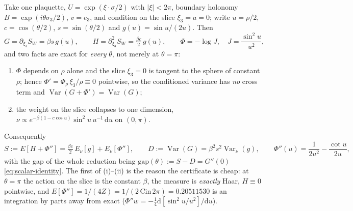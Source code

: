 Take one plaquette, $U=\exp(\xi\cdot\sigma/2)$ with $|\xi|<2\pi$, boundary holonomy
$B=\exp(i\theta\sigma_{3}/2)$, $v=e_{3}$, and condition on the slice $\xi_{3}=a=0$; write
$u=\rho/2$, $c=\cos(\theta/2)$, $s=\sin(\theta/2)$ and
$g(u)=\sin u/(2u)$. Then
\begin{equation}
G=\partial_{\xi_{3}}S_W=\beta s\,g(u),\qquad
H=\partial^{2}_{\xi_{3}}S_W=\tfrac{\beta c}{2}\,g(u),\qquad
\Phi=-\log J,\quad J=\frac{\sin^{2}u}{u^{2}} ,
\label{eq:h1s-GH}
\end{equation}
and two facts are exact for \emph{every} $\theta$, not merely at $\theta=\pi$:
\begin{enumerate}[label=(\roman*)]
\item $\Phi$ depends on $\rho$ alone and the slice $\xi_{3}=0$ is tangent to the sphere of constant
  $\rho$; hence $\Phi'=\Phi_{\rho}\,\xi_{3}/\rho\equiv0$ pointwise, so the conditioned variance has
  \emph{no} cross term and $\operatorname{Var}(G+\Phi')=\operatorname{Var}(G)$;
\item the weight on the slice collapses to one dimension,
  $\nu\propto e^{-\beta(1-c\cos u)}\sin^{2}u\,u^{-1}\,\mathrm{d} u$ on $(0,\pi)$.
\end{enumerate}
Consequently
\begin{equation}
S:=E[H+\Phi'']=\tfrac{\beta c}{2}\,E_{\nu}[g]+E_{\nu}[\Phi''],\qquad
D:=\operatorname{Var}(G)=\beta^{2}s^{2}\operatorname{Var}_{\nu}(g),
\qquad
\Phi''(u)=\frac{1}{2u^{2}}-\frac{\cot u}{2u} ,
\label{eq:h1s-SD}
\end{equation}
with the gap of the whole reduction being $\mathrm{gap}(\theta):=S-D=G''(0)$ \eqref{eq:scalar-identity}.
The first of (i)--(ii) is the reason the certificate is cheap: at $\theta=\pi$ the action on the slice
is the constant $\beta$, the measure is \emph{exactly} Haar, $H\equiv0$ pointwise, and
$E[\Phi'']=1/(4Z)=1/(2\,\mathrm{Cin}\,2\pi)=0.20511530$ is an integration by parts away from exact
($\Phi''w=-\tfrac14\mathrm{d}[\sin^{2}u/u^{2}]/\mathrm{d} u$). \LT


